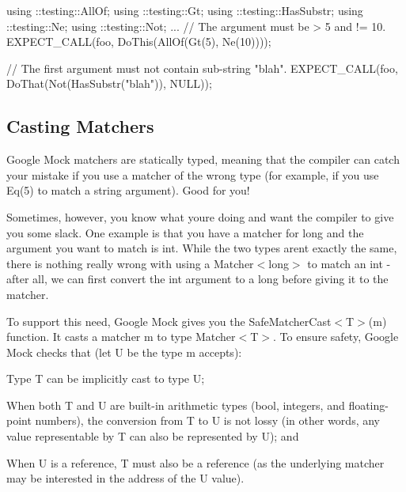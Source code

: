 \begin{DoxyCode}
using ::testing::AllOf;
using ::testing::Gt;
using ::testing::HasSubstr;
using ::testing::Ne;
using ::testing::Not;
...
  // The argument must be > 5 and != 10.
  EXPECT\_CALL(foo, DoThis(AllOf(Gt(5),
                                Ne(10))));

  // The first argument must not contain sub-string "blah".
  EXPECT\_CALL(foo, DoThat(Not(HasSubstr("blah")),
                          NULL));
\end{DoxyCode}


\subsection*{Casting Matchers}

Google Mock matchers are statically typed, meaning that the compiler can catch your mistake if you use a matcher of the wrong type (for example, if you use {\ttfamily Eq(5)} to match a {\ttfamily string} argument). Good for you!

Sometimes, however, you know what you\textquotesingle{}re doing and want the compiler to give you some slack. One example is that you have a matcher for {\ttfamily long} and the argument you want to match is {\ttfamily int}. While the two types aren\textquotesingle{}t exactly the same, there is nothing really wrong with using a {\ttfamily Matcher$<$long$>$} to match an {\ttfamily int} -\/ after all, we can first convert the {\ttfamily int} argument to a {\ttfamily long} before giving it to the matcher.

To support this need, Google Mock gives you the {\ttfamily Safe\+Matcher\+Cast$<$T$>$(m)} function. It casts a matcher {\ttfamily m} to type {\ttfamily Matcher$<$T$>$}. To ensure safety, Google Mock checks that (let {\ttfamily U} be the type {\ttfamily m} accepts)\+:


\begin{DoxyEnumerate}
\item Type {\ttfamily T} can be implicitly cast to type {\ttfamily U};
\end{DoxyEnumerate}
\begin{DoxyEnumerate}
\item When both {\ttfamily T} and {\ttfamily U} are built-\/in arithmetic types ({\ttfamily bool}, integers, and floating-\/point numbers), the conversion from {\ttfamily T} to {\ttfamily U} is not lossy (in other words, any value representable by {\ttfamily T} can also be represented by {\ttfamily U}); and
\end{DoxyEnumerate}
\begin{DoxyEnumerate}
\item When {\ttfamily U} is a reference, {\ttfamily T} must also be a reference (as the underlying matcher may be interested in the address of the {\ttfamily U} value).
\end{DoxyEnumerate}

